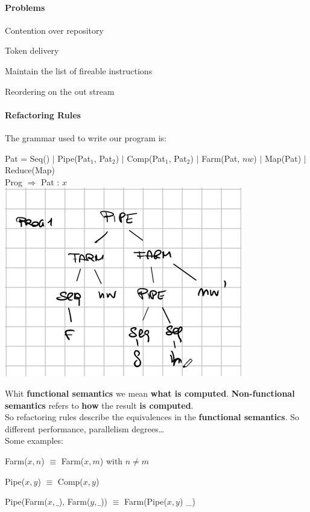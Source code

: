 \documentclass[10pt]{report}
\begin{document}
\paragraph{Problems}\begin{list}{}{}
	\item Contention over repository
	\item Token delivery
	\item Maintain the list of fireable instructions
	\item Reordering on the out stream
\end{list}
\paragraph{Refactoring Rules}
The grammar used to write our program is:
\begin{center}
	Pat = Seq() $|$ Pipe(Pat$_1$, Pat$_2$) $|$ Comp(Pat$_1$, Pat$_2$) $|$ Farm(Pat, $nw$) $|$ Map(Pat) $|$ Reduce(Map)\\
	Prog $\Rightarrow$ Pat : $x$\\
	\includegraphics[scale=0.5]{12.png}
\end{center}
Whit \textbf{functional semantics} we mean \textbf{what is computed}. \textbf{Non-functional semantics} refers to \textbf{how} the result \textbf{is computed}.\\
So refactoring rules describe the equivalences in the \textbf{functional semantics}. So different performance, parallelism degrees\ldots\\
Some examples:
\begin{list}{}{}
	\item Farm($x, n$) $\equiv$ Farm($x, m$) with $n\neq m$
	\item Pipe($x, y$) $\equiv$ Comp($x, y$)
	\item Pipe(Farm($x, \_$), Farm($y, \_$)) $\equiv$ Farm(Pipe($x, y$) \_)
\end{list}
\end{document}
